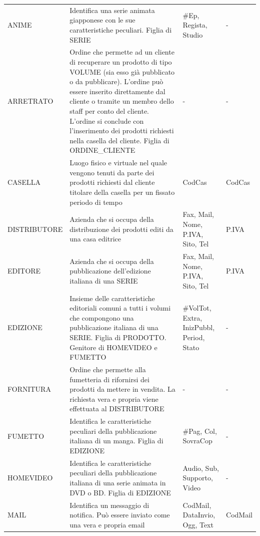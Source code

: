 \documentclass[a4paper]{scrartcl}
\begin{document}
\begin{footnotesize}
\begin{longtable}{p{} p{} p{} p{}}
	ANIME &
	Identifica una serie animata giapponese con le sue caratteristiche peculiari. Figlia di SERIE &
	\#{Ep}, Regista, Studio &
	- \\
	
	ARRETRATO &
	Ordine che permette ad un cliente di recuperare un prodotto di tipo VOLUME (sia esso già pubblicato o da pubblicare). L'ordine può essere inserito direttamente dal cliente o tramite un membro dello staff per conto del cliente. L'ordine si conclude con l'inserimento dei prodotti richiesti nella casella del cliente. Figlia di ORDINE\_{CLIENTE}  &
	- &
	- \\
	
	CASELLA &
	Luogo fisico e virtuale nel quale vengono tenuti da parte dei prodotti richiesti dal cliente titolare della casella per un fissato periodo di tempo &
	CodCas &
	CodCas \\

	DISTRIBUTORE & 
	Azienda che si occupa della distribuzione dei prodotti editi da una casa editrice &
	Fax, Mail, Nome, P.IVA, Sito, Tel &
	P.IVA \\
	
	EDITORE &
	Azienda che si occupa della pubblicazione dell'edizione italiana di una SERIE &
	Fax, Mail, Nome, P.IVA, Sito, Tel &
	P.IVA \\
	
	EDIZIONE &
	Insieme delle caratteristiche editoriali comuni a tutti i volumi che compongono una pubblicazione italiana di una SERIE. Figlia di PRODOTTO. Genitore di HOMEVIDEO e FUMETTO &
	\#{VolTot}, Extra, InizPubbl, Period, Stato &
	- \\
	
	FORNITURA &
	Ordine che permette alla fumetteria di rifornirsi dei prodotti da mettere in vendita. La richiesta vera e propria viene effettuata al DISTRIBUTORE &
	- &
	- \\
	
	FUMETTO &
	Identifica le caratteristiche peculiari della pubblicazione italiana di un manga. Figlia di EDIZIONE &
	\#{Pag}, Col, SovraCop &
	- \\
	
	HOMEVIDEO &
	Identifica le caratteristiche peculiari della pubblicazione italiana di una serie animata in DVD o BD. Figlia di EDIZIONE &
	Audio, Sub, Supporto, Video &
	- \\
	
	MAIL &
	Identifica un messaggio di notifica. Può essere inviato come una vera e propria email &
	CodMail, DataInvio, Ogg, Text &
	CodMail \\
	

\end{longtable}
\end{footnotesize}
\end{document}

